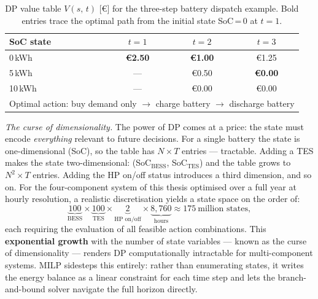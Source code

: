 \documentclass[11pt,a4paper]{report}
\begin{document}
\begin{itemize}
    \begin{table}[H]
    \centering
    \caption{DP value table $V(s,\,t)$ [\euro] for the three-step battery dispatch example. Bold entries trace the optimal path from the initial state SoC\,=\,0 at $t=1$.}
    \label{tab:dp_example}
    \begin{tabular}{lccc}
    \toprule
    \textbf{SoC state} & $t=1$ & $t=2$ & $t=3$ \\
    \midrule
    0\,kWh  & \textbf{\euro2.50} & \textbf{\euro1.00} & \euro1.25 \\
    5\,kWh  & ---                & \euro0.50          & \textbf{\euro0.00} \\
    10\,kWh & ---                & \euro0.00          & \euro0.00 \\
    \midrule
    \multicolumn{4}{l}{\small Optimal action: buy demand only $\to$ charge battery $\to$ discharge battery} \\
    \bottomrule
    \end{tabular}
    \end{table}

    \textit{The curse of dimensionality.}
    The power of DP comes at a price: the state must encode \emph{everything} relevant to future decisions.
    For a single battery the state is one-dimensional (SoC), so the table has $N \times T$ entries --- tractable.
    Adding a TES makes the state two-dimensional: (SoC$_\text{BESS}$, SoC$_\text{TES}$) and the table grows to $N^2 \times T$ entries.
    Adding the HP on/off status introduces a third dimension, and so on.
    For the four-component system of this thesis optimised over a full year at hourly resolution, a realistic discretisation yields a state space on the order of:
    \begin{equation*}
        \underbrace{100}_{\text{BESS}} \times \underbrace{100}_{\text{TES}} \times \underbrace{2}_{\text{HP on/off}} \times \underbrace{8{,}760}_{\text{hours}} \approx 175\ \text{million states},
    \end{equation*}
    each requiring the evaluation of all feasible action combinations.
    This \textbf{exponential growth} with the number of state variables --- known as the curse of dimensionality --- renders DP computationally intractable for multi-component systems.
    MILP sidesteps this entirely: rather than enumerating states, it writes the energy balance as a linear constraint for each time step and lets the branch-and-bound solver navigate the full horizon directly.
\end{itemize}
\end{document}
